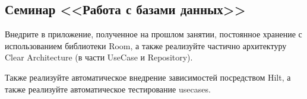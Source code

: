 \subsection{Семинар <<Работа с базами данных>>}

Внедрите в приложение, полученное на прошлом занятии, постоянное хранение с использованием библиотеки Room, 
а также реализуйте частично архитектуру Clear Architecture (в части UseCase и Repository).

Также реализуйте автоматическое внедрение зависимостей посредством Hilt, а также реализуйте автоматическое 
тестирование usecases.


